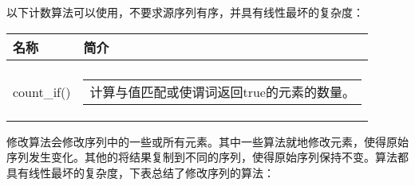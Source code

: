 
以下计数算法可以使用，不要求源序列有序，并具有线性最坏的复杂度：

\begin{longtable}{|l|l|}
\hline
\textbf{名称} &
\textbf{简介} \\ \hline
\endfirsthead
%
\endhead
%
\begin{tabular}[c]{@{}l@{}}count()\\ count\_if()\end{tabular} &
\begin{tabular}[c]{@{}l@{}}计算与值匹配或使谓词返回true的元素的数量。
\end{tabular} \\ \hline
\end{longtable}


修改算法会修改序列中的一些或所有元素。其中一些算法就地修改元素，使得原始序列发生变化。其他的将结果复制到不同的序列，使得原始序列保持不变。算法都具有线性最坏的复杂度，下表总结了修改序列的算法：

